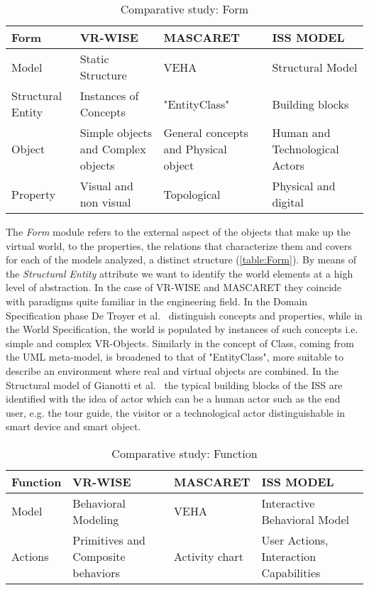 \begin{table}
\begin{tabular}{|p{2.2cm}|p{3.1cm}|p{3.1cm}|p{3.1cm}|} 
\hline %
\textbf{Form} 
& \textbf{VR-WISE} 
& \textbf{MASCARET}
& \textbf{ISS MODEL} \\ 
\hline
Model
& Static Structure
& VEHA
& Structural Model \\ 
\hline
Structural Entity
& Instances of Concepts
& "EntityClass"
& Building blocks \\ 
\hline
Object
& Simple objects and Complex objects
& General concepts and Physical object
& Human and Technological Actors \\ 
\hline
Property
& Visual and non visual
& Topological 
& Physical and digital \\ 
\hline
\end{tabular} 
\caption{Comparative study: Form}
\label{table:Form}
\end{table}

The \textit{Form} module refers to the external aspect of the objects that make up the virtual world, to the properties, the relations that characterize them and covers for each of the models analyzed, a distinct structure (\autoref{table:Form}). By means of the \textit{Structural Entity} attribute we want to identify the world elements at a high level of abstraction. In the case of VR-WISE and MASCARET they coincide with paradigms quite familiar in the engineering field. 
In the Domain Specification phase De Troyer et al.~\cite{de_troyer_conceptual_2007} distinguish concepts and properties, while in the World Specification, the world is populated by instances of such concepts i.e. simple and complex VR-Objects. Similarly in \cite{chevaillier_semantic_2012} the concept of Class, coming from the UML meta-model, is broadened to that of "EntityClass", more suitable to describe an environment where real and virtual objects are combined. 
In the Structural model of Gianotti et al.~\cite{dobbie_modeling_2020} the typical building blocks of the ISS are identified with the idea of actor which can be a human actor such as the end user, e.g. the tour guide, the visitor or a technological actor distinguishable in smart device and smart object. 

\begin{table}
\begin{tabular}{|p{2.2cm}|p{3.1cm}|p{3.1cm}|p{3.1cm}|} 
\hline %
\textbf{Function} 
& \textbf{VR-WISE} 
& \textbf{MASCARET}
& \textbf{ISS MODEL} \\ 
\hline
Model
& Behavioral Modeling
& VEHA
& Interactive Behavioral Model \\ 
\hline
Actions
& Primitives and Composite behaviors
& Activity chart
& User Actions, Interaction Capabilities \\ 
\hline
\end{tabular} 
\caption{Comparative study: Function}
\label{table:Function}
\end{table}

